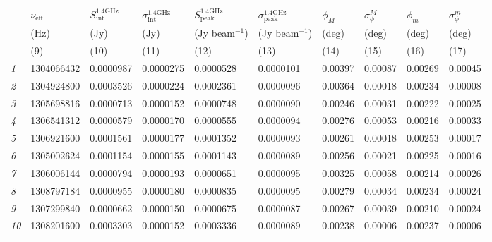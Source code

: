 \documentclass[usenatbib,usedcolumn]{mnras}
\begin{document}
\begin{table*}
\begin{minipage}{176mm}
\begin{tabular}{llllllllll} \hline
 &  $\nu_{\mathrm{eff}}$ & $S^{\mathrm{1.4GHz}}_{\mathrm{int}}$ & $\sigma^{\mathrm{1.4GHz}}_{\mathrm{int}}$ & $S^{\mathrm{1.4GHz}}_{\mathrm{peak}}$ & $\sigma^{\mathrm{1.4GHz}}_{\mathrm{peak}}$ & $\phi_{M}$ & $\sigma_{\phi}^{M}$ & $\phi_{m}$ & $\sigma_{\phi}^{m}$ \\
 & (Hz) & (Jy) & (Jy) & (Jy beam$^{-1}$) & (Jy beam$^{-1}$) & (deg) & (deg) & (deg) & (deg)  \\
 & (9) & (10) & (11) & (12) & (13) & (14) & (15) & (16) & (17) \\ \hline 
\textcolor{mygray}{\emph{1}} & 1304066432 & 0.0000987 & 0.0000275 & 0.0000528 & 0.0000101 & 0.00397 & 0.00087 & 0.00269 & 0.00045 \\
\textcolor{mygray}{\emph{2}} & 1304924800 & 0.0003526 & 0.0000224 & 0.0002361 & 0.0000096 & 0.00364 & 0.00018 & 0.00234 & 0.00008 \\
\textcolor{mygray}{\emph{3}} & 1305698816 & 0.0000713 & 0.0000152 & 0.0000748 & 0.0000090 & 0.00246 & 0.00031 & 0.00222 & 0.00025 \\
\textcolor{mygray}{\emph{4}} & 1306541312 & 0.0000579 & 0.0000170 & 0.0000555 & 0.0000094 & 0.00276 & 0.00053 & 0.00216 & 0.00033 \\
\textcolor{mygray}{\emph{5}} & 1306921600 & 0.0001561 & 0.0000177 & 0.0001352 & 0.0000093 & 0.00261 & 0.00018 & 0.00253 & 0.00017 \\
\textcolor{mygray}{\emph{6}} & 1305002624 & 0.0001154 & 0.0000155 & 0.0001143 & 0.0000089 & 0.00256 & 0.00021 & 0.00225 & 0.00016 \\
\textcolor{mygray}{\emph{7}} & 1306006144 & 0.0000794 & 0.0000193 & 0.0000651 & 0.0000095 & 0.00325 & 0.00058 & 0.00214 & 0.00026 \\
\textcolor{mygray}{\emph{8}} & 1308797184 & 0.0000955 & 0.0000180 & 0.0000835 & 0.0000095 & 0.00279 & 0.00034 & 0.00234 & 0.00024 \\
\textcolor{mygray}{\emph{9}} & 1307299840 & 0.0000662 & 0.0000150 & 0.0000675 & 0.0000087 & 0.00267 & 0.00039 & 0.00210 & 0.00024 \\
\textcolor{mygray}{\emph{10}} & 1308201600 & 0.0003303 & 0.0000152 & 0.0003336 & 0.0000089 & 0.00238 & 0.00006 & 0.00237 & 0.00006 \\
\hline
\end{tabular}
\vspace{2mm}


\end{minipage}
\end{table*}
\end{document}
